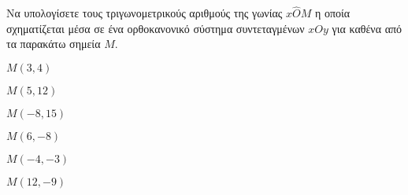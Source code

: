 Να υπολογίσετε τους τριγωνομετρικούς αριθμούς της γωνίας $ x\hat{O}M $ η οποία σχηματίζεται μέσα σε ένα ορθοκανονικό σύστημα συντεταγμένων $ xOy $ για καθένα από τα παρακάτω σημεία $ M $.
\begin{multicols}{2}
\begin{rlist}[leftmargin=4mm]
\item $ M(3,4) $
\item $ M(5,12) $
\item $ M(-8,15) $
\item $ M(6,-8) $
\item $ M(-4,-3) $
\item $ M(12,-9) $
\end{rlist}
\end{multicols}

